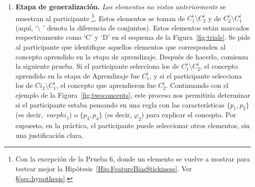 \begin{enumerate}
	\item {\bf Etapa de generalización.} {\em Los elementos no vistos anteriormente} se muestran al participante \footnote{Con la excepción de la Prueba 6, donde un elemento se vuelve a mostrar para testear mejor la Hipótesis~\ref{Hip:FeatureBiasStickiness}. Ver \S\ref{sec:hypothesis}.}. Estos elementos se toman de $C^i_1 \setminus C^i_2$ y de $C^i_2 \setminus C^i_1$ (aquí, `$\setminus$ ' denota la diferencia de conjuntos). Estos elementos están marcados respectivamente como `{\sf C}' y `{\sf D}' en el esquema de la Figura~\ref{fig:trials}. Se pide al participante que identifique aquellos elementos que corresponden al concepto aprendido en la etapa de aprendizaje. Después de hacerlo, comienza la siguiente prueba. Si el participante selecciona los de $C^i_1 \setminus C^i_2$, el concepto aprendido en la etapa de Aprendizaje fue $C^i_1$, y si el participante selecciona los de $C i_2 \setminus C^i_1$, el concepto que aprendieron fue $C^i_2$.
    Continuando con el ejemplo de la Figura~\ref{fig:twoconcepts}, este proceso nos permitiría determinar si el participante estaba pensando en una regla con las características $\{p_1, p_2 \}$ (es decir, $\ varphi_1$) o $\{p_3, p_4 \}$ (es decir, $\varphi_2$) para explicar el concepto. Por supuesto, en la práctica, el participante puede seleccionar otros elementos, sin una justificación clara.


\end{enumerate}
